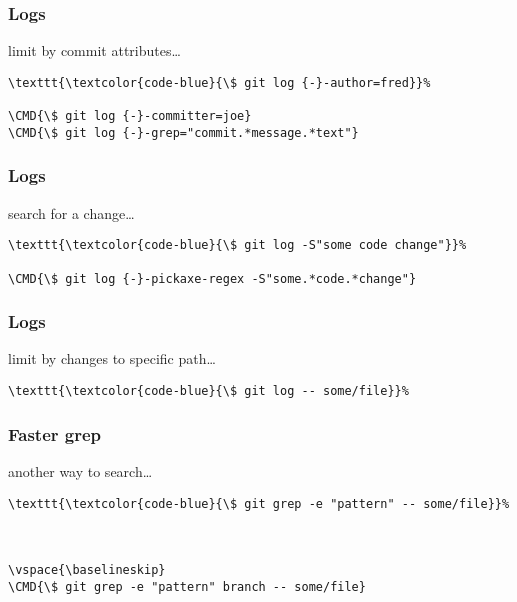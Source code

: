 \documentclass[english]{beamer}
\newcommand{\CMD}[1]{%
\texttt{\textcolor{code-blue}{#1}}%
}
\begin{document}
\begin{frame}[fragile]
\frametitle{Logs}

limit by commit attributes\ldots
\vspace{\baselineskip}

\begin{Verbatim}[commandchars=\\\{\}]
\CMD{\$ git log {-}-author=fred}
\CMD{\$ git log {-}-committer=joe}
\CMD{\$ git log {-}-grep="commit.*message.*text"}
\end{Verbatim}

\vspace{\textheight}
\end{frame}

\begin{frame}[fragile]
\frametitle{Logs}

search for a change\ldots
\vspace{\baselineskip}

\begin{Verbatim}[commandchars=\\\{\}]
\CMD{\$ git log -S"some code change"}
\CMD{\$ git log {-}-pickaxe-regex -S"some.*code.*change"}
\end{Verbatim}

\vspace{\textheight}
\end{frame}

\begin{frame}[fragile]
\frametitle{Logs}

limit by changes to specific path\ldots
\vspace{\baselineskip}

\begin{Verbatim}[commandchars=\\\{\}]
\CMD{\$ git log -- some/file}
\end{Verbatim}

\vspace{\textheight}
\end{frame}

\begin{frame}[fragile]
\frametitle{Faster grep}

another way to search\ldots
\vspace{\baselineskip}

\begin{Verbatim}[commandchars=\\\{\}]
\CMD{\$ git grep -e "pattern" -- some/file}


\vspace{\baselineskip}
\CMD{\$ git grep -e "pattern" branch -- some/file}
\end{Verbatim}

\vspace{\textheight}
\end{frame}
\end{document}
